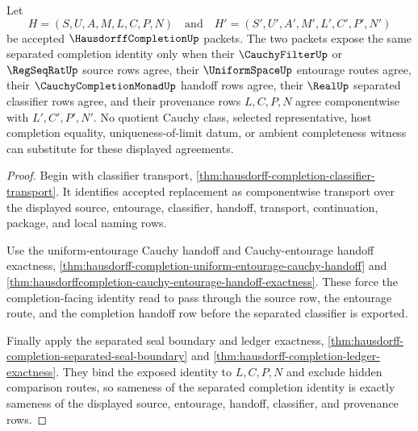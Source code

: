 \begin{theorem}
\label{thm:hausdorffcompletion-separated-source-identity-criterion}
Let
$$
H=(S,U,A,M,L,C,P,N)
\quad\text{and}\quad
H'=(S',U',A',M',L',C',P',N')
$$
be accepted $\HausdorffCompletionUp$ packets. The two packets expose the same
separated completion identity only when their $\CauchyFilterUp$ or
$\RegSeqRatUp$ source rows agree, their $\UniformSpaceUp$ entourage routes
agree, their $\CauchyCompletionMonadUp$ handoff rows agree, their $\RealUp$
separated classifier rows agree, and their provenance rows $L,C,P,N$ agree
componentwise with $L',C',P',N'$. No quotient Cauchy class, selected
representative, host completion equality, uniqueness-of-limit datum, or
ambient completeness witness can substitute for these displayed agreements.
\end{theorem}
\begin{proof}
Begin with classifier transport,
\autoref{thm:hausdorff-completion-classifier-transport}. It identifies accepted
replacement as componentwise transport over the displayed source, entourage,
classifier, handoff, transport, continuation, package, and local naming rows.

Use the uniform-entourage Cauchy handoff and Cauchy-entourage handoff
exactness, \autoref{thm:hausdorff-completion-uniform-entourage-cauchy-handoff}
and \autoref{thm:hausdorffcompletion-cauchy-entourage-handoff-exactness}. These
force the completion-facing identity read to pass through the source row, the
entourage route, and the completion handoff row before the separated classifier
is exported.

Finally apply the separated seal boundary and ledger exactness,
\autoref{thm:hausdorff-completion-separated-seal-boundary} and
\autoref{thm:hausdorff-completion-ledger-exactness}. They bind the exposed
identity to $L,C,P,N$ and exclude hidden comparison routes, so sameness of the
separated completion identity is exactly sameness of the displayed source,
entourage, handoff, classifier, and provenance rows.
\end{proof}

